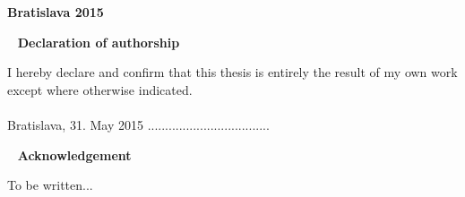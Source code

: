 \vfill
\noindent
{\bf Bratislava 2015}  \hfill {\bf \autor}
\thispagestyle{empty}


\newpage
{~}\vfill
{\noindent \large\bf Declaration of authorship} 
\vspace{1.5cm}

I hereby declare and confirm that this thesis is entirely the result of my own work except
where otherwise indicated.\\\\ 
Bratislava, 31. May 2015
\hfill ................................... 
\vspace{1cm}

\newpage
{~}\vfill
{\noindent\large\bf Acknowledgement} 
\vspace{1.5cm}

To be written...  \\
\vspace{1cm}

\newpage

